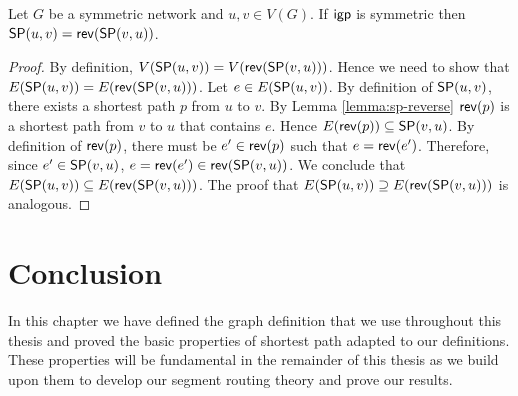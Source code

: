 \begin{corollary}
\label{cor:dag-rev}
Let $G$ be a symmetric network and $u, v \in V(G)$. If $\igp$ is symmetric then $\sp(u, v) = \rev(\sp(v, u))$. 
\end{corollary}

\begin{proof}
By definition, $V(\sp(u, v)) = V(\rev(\sp(v, u)))$. Hence we need to show that $E(\sp(u, v)) = E(\rev(\sp(v, u)))$. 
Let $e \in E(\sp(u, v))$. By definition of $\sp(u, v)$, there exists a shortest path $p$ from $u$ to $v$. By Lemma
\ref{lemma:sp-reverse} $\rev(p)$ is a shortest path from $v$ to $u$ that contains $e$. Hence $E(\rev(p)) \subseteq \sp(v, u)$. 
By definition of $\rev(p)$, there must be $e' \in \rev(p)$ such that $e = \rev(e')$. Therefore, since $e' \in \sp(v, u)$,
$e = \rev(e') \in \rev(\sp(v, u))$. We conclude that $E(\sp(u, v)) \subseteq E(\rev(\sp(v, u)))$. The proof that 
$E(\sp(u, v)) \supseteq E(\rev(\sp(v, u)))$ is analogous.
\end{proof}

\section*{Conclusion}

In this chapter we have defined the graph definition that we use throughout this thesis and proved the basic
properties of shortest path adapted to our definitions. These properties will be fundamental in the remainder of this
thesis as we build upon them to develop our segment routing theory and prove our results.
